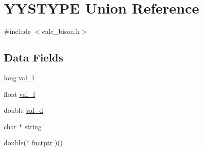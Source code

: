 \hypertarget{unionYYSTYPE}{\section{Y\+Y\+S\+T\+Y\+P\+E Union Reference}
\label{unionYYSTYPE}
}


{\ttfamily \#include $<$calc\+\_\+bison.\+h$>$}

\subsection*{Data Fields}
\begin{DoxyCompactItemize}
\item 
long \hyperlink{unionYYSTYPE_a81f209066080f5ffa329c1772b8b70c5}{val\+\_\+l}
\item 
float \hyperlink{unionYYSTYPE_a6f4050b34641ae09204f63c853cb4c92}{val\+\_\+f}
\item 
double \hyperlink{unionYYSTYPE_a61bc717a8d5bde0979541eb670984140}{val\+\_\+d}
\item 
char $\ast$ \hyperlink{unionYYSTYPE_a0138efb4387041e915681aff6dfd68ff}{string}
\item 
double($\ast$ \hyperlink{unionYYSTYPE_a2ede02959c9774fe63cc959095e4a50f}{fnctptr} )()
\end{DoxyCompactItemize}


